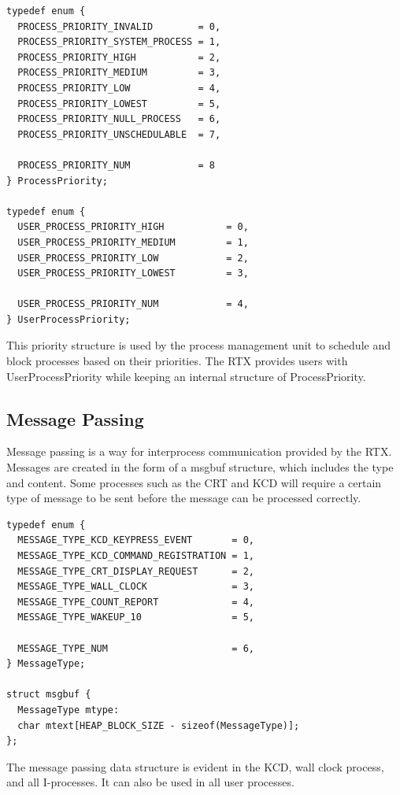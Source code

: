 \documentclass[12pt]{report}
\begin{document}
\begin{lstlisting}
typedef enum {
  PROCESS_PRIORITY_INVALID        = 0,
  PROCESS_PRIORITY_SYSTEM_PROCESS = 1,
  PROCESS_PRIORITY_HIGH           = 2,
  PROCESS_PRIORITY_MEDIUM         = 3,
  PROCESS_PRIORITY_LOW            = 4,
  PROCESS_PRIORITY_LOWEST         = 5,
  PROCESS_PRIORITY_NULL_PROCESS   = 6,
  PROCESS_PRIORITY_UNSCHEDULABLE  = 7,

  PROCESS_PRIORITY_NUM            = 8
} ProcessPriority;

typedef enum {
  USER_PROCESS_PRIORITY_HIGH           = 0,
  USER_PROCESS_PRIORITY_MEDIUM         = 1,
  USER_PROCESS_PRIORITY_LOW            = 2,
  USER_PROCESS_PRIORITY_LOWEST         = 3,

  USER_PROCESS_PRIORITY_NUM            = 4,
} UserProcessPriority;
\end{lstlisting}

This priority structure is used by the process management unit to schedule and block processes based on their priorities. The RTX provides users with UserProcessPriority while keeping an internal structure of ProcessPriority.

\subsection{Message Passing}
Message passing is a way for interprocess communication provided by the RTX. Messages are created in the form of a msgbuf structure, which includes the type and content. Some processes such as the CRT and KCD will require a certain type of message to be sent before the message can be processed correctly.

\begin{lstlisting}
typedef enum {
  MESSAGE_TYPE_KCD_KEYPRESS_EVENT       = 0,
  MESSAGE_TYPE_KCD_COMMAND_REGISTRATION = 1,
  MESSAGE_TYPE_CRT_DISPLAY_REQUEST      = 2,
  MESSAGE_TYPE_WALL_CLOCK               = 3,
  MESSAGE_TYPE_COUNT_REPORT             = 4,
  MESSAGE_TYPE_WAKEUP_10                = 5,

  MESSAGE_TYPE_NUM                      = 6,
} MessageType;

struct msgbuf {
  MessageType mtype:
  char mtext[HEAP_BLOCK_SIZE - sizeof(MessageType)];
};

\end{lstlisting}

The message passing data structure is evident in the KCD, wall clock process, and all I-processes. It can also be used in all user processes.
\end{document}

